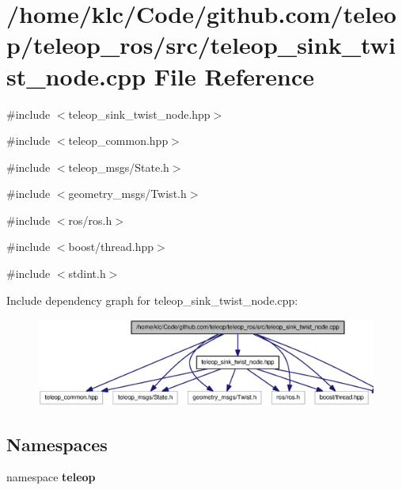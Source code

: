 \section{/home/klc/Code/github.com/teleop/teleop\_\-ros/src/teleop\_\-sink\_\-twist\_\-node.cpp File Reference}
\label{teleop__sink__twist__node_8cpp}
{\ttfamily \#include $<$teleop\_\-sink\_\-twist\_\-node.hpp$>$}\par
{\ttfamily \#include $<$teleop\_\-common.hpp$>$}\par
{\ttfamily \#include $<$teleop\_\-msgs/State.h$>$}\par
{\ttfamily \#include $<$geometry\_\-msgs/Twist.h$>$}\par
{\ttfamily \#include $<$ros/ros.h$>$}\par
{\ttfamily \#include $<$boost/thread.hpp$>$}\par
{\ttfamily \#include $<$stdint.h$>$}\par
Include dependency graph for teleop\_\-sink\_\-twist\_\-node.cpp:
\nopagebreak
\begin{figure}[H]
\begin{center}
\leavevmode
\includegraphics[width=400pt]{teleop__sink__twist__node_8cpp__incl}
\end{center}
\end{figure}
\subsection*{Namespaces}
\begin{DoxyCompactItemize}
\item 
namespace {\bf teleop}
\end{DoxyCompactItemize}
